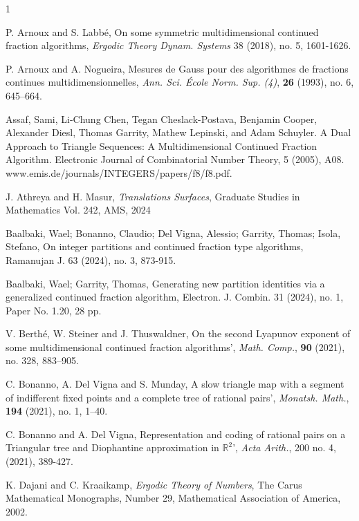 \documentclass[12pt,oneside,openany]{article}
\def\R{{\mathbb R}} %
\begin{document}
\begin{thebibliography}{1}

 P. Arnoux and S. Labb\'{e}, On some symmetric multidimensional continued fraction algorithms, {\it Ergodic Theory Dynam. Systems}  38 (2018), no. 5, 1601-1626.


  P. Arnoux and A. Nogueira, Mesures de Gauss pour des algorithmes de fractions continues multidimensionnelles, \emph{Ann. Sci. \'Ecole Norm. Sup. (4)}, \textbf{26} (1993), no. 6, 645--664.
 
 
 
 
Assaf, Sami, Li-Chung Chen, Tegan Cheslack-Postava, Benjamin Cooper, Alexander Diesl, Thomas Garrity, Mathew Lepinski, and Adam Schuyler. A Dual Approach to Triangle Sequences: A Multidimensional Continued Fraction Algorithm. Electronic Journal of Combinatorial Number Theory, 5 (2005), A08. www.emis.de/journals/INTEGERS/papers/f8/f8.pdf.


 J. Athreya and H. Masur, {\it Translations Surfaces}, Graduate Studies in Mathematics Vol. 242, AMS, 2024


  Baalbaki, Wael; Bonanno, Claudio; Del Vigna, Alessio; Garrity, Thomas; Isola, Stefano,  On integer partitions and continued fraction type algorithms, Ramanujan J. 63 (2024), no. 3, 873-915.
 
  Baalbaki, Wael; Garrity, Thomas, Generating new partition identities via a generalized continued fraction algorithm, Electron. J. Combin. 31 (2024), no. 1, Paper No. 1.20, 28 pp.


  V. Berth\'e, W. Steiner and J. Thuswaldner, On the second Lyapunov exponent of some multidimensional continued fraction algorithms', {\it Math. Comp.}, \textbf{90} (2021), no. 328, 883--905.

 C. Bonanno, A. Del Vigna and S. Munday,  A slow triangle map with a segment of indifferent fixed points and a complete tree of rational pairs', \emph{Monatsh. Math.}, \textbf{194} (2021), no. 1, 1--40.

 C. Bonanno and A. Del Vigna,  Representation and coding of rational pairs on a Triangular tree and Diophantine approximation in $\R^2$',  {\it Acta Arith.}, 200 no. 4, (2021), 389-427.

 K. Dajani and C. Kraaikamp, \textit{Ergodic Theory of Numbers}, The Carus Mathematical Monographs, Number 29, Mathematical Association of America, 2002.





\end{thebibliography}
\end{document}
